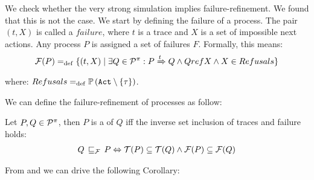 We check whether the very strong simulation implies failure-refinement. We found that this is not the case. We start by defining the failure of a process.
The pair $(t, X)$ is called a $failure$, where $t$ is a trace and $X$ is a set of impossible next actions. Any process
$P$ is assigned a set of failures $F$. Formally, this means:
\begin{align}
    \Failures[P] \define \{(t,X) \mid \exists Q\in\procs: P \bigstep{t} Q \wedge Q ref X \wedge X\in Refusals\}
\label{failure}
\end{align}
where: $Refusals \define \pom{\actions\setminus\set{\tau}}$.

We can define the failure-refinement of \picalc{} processes as follow:

\begin{definition}
\label{def_failure_ref}
	Let $P,Q\in\mathcal P^{\pi}$, then $P$ is a  of $Q$ iff the inverse set inclusion of traces and failure holds:
\begin{align}
   Q \refiF P \Leftrightarrow  \Traces[P]\subseteq\Traces[Q] \wedge \Failures[P]\subseteq\Failures[Q]
\end{align}
\end{definition}

From  and  we can drive the following Corollary: 

